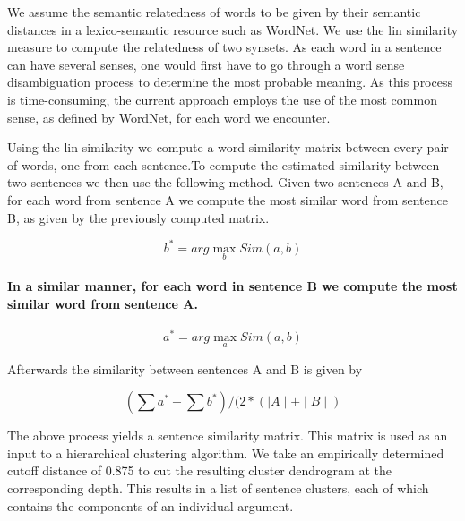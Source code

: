 \par
We assume the semantic relatedness of words to be given by their semantic distances in a lexico-semantic resource such as WordNet. We use the lin similarity measure to compute the relatedness of two synsets. As each word in a sentence can have several senses, one would first have to go through a word sense disambiguation process to determine the most probable meaning. As this process is time-consuming, the current approach employs the use of the most common sense, as defined by WordNet, for each word we encounter.
\par
Using the lin\cite{lin} similarity we compute a word similarity matrix between every pair of words, one from each sentence.To compute the estimated similarity between two sentences we then use the following method. Given two sentences A and B, for each word from sentence A we compute the most similar word from sentence B, as given by the previously computed matrix.

\[ b^* = arg \max_b Sim(a,b) \]

\paragraph*{In a similar manner, for each word in sentence B we compute the most similar word from sentence A.}

\[ a^* = arg \max_a Sim(a,b) \]

\par
Afterwards the similarity between sentences A and B is given by

\[ ( \sum{a^*} + \sum{b^*}) / (2 * (\mid A\mid + \mid B \mid ) \]

\par
The above process yields a sentence similarity matrix. This matrix is used as an input to a hierarchical clustering algorithm. We take an empirically determined cutoff distance of 0.875 to cut the resulting cluster dendrogram at the corresponding depth. This results in a list of sentence clusters, each of which contains the components of an individual argument.

